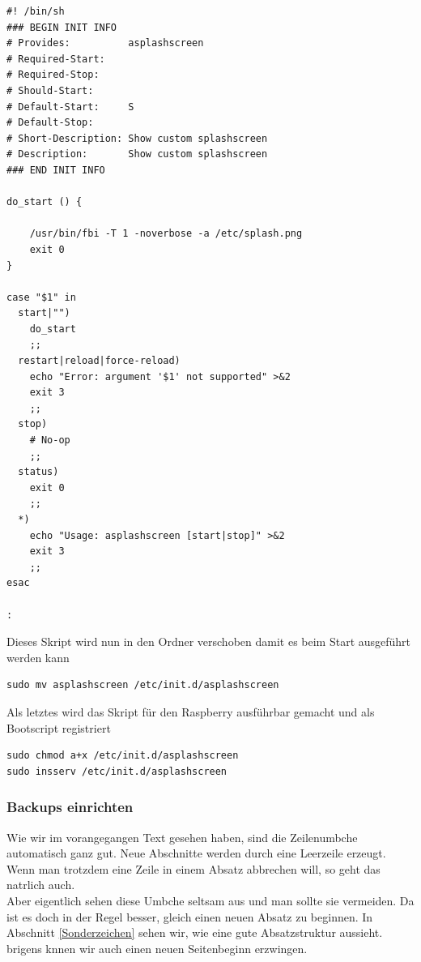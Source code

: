 \documentclass[11pt,a4paper]{article} %
\begin{document}
\begin{frame}

\begin{lstlisting}
#! /bin/sh
### BEGIN INIT INFO
# Provides:          asplashscreen
# Required-Start:
# Required-Stop:
# Should-Start:      
# Default-Start:     S
# Default-Stop:
# Short-Description: Show custom splashscreen
# Description:       Show custom splashscreen
### END INIT INFO
 
do_start () {
 
    /usr/bin/fbi -T 1 -noverbose -a /etc/splash.png    
    exit 0
}
 
case "$1" in
  start|"")
    do_start
    ;;
  restart|reload|force-reload)
    echo "Error: argument '$1' not supported" >&2
    exit 3
    ;;
  stop)
    # No-op
    ;;
  status)
    exit 0
    ;;
  *)
    echo "Usage: asplashscreen [start|stop]" >&2
    exit 3
    ;;
esac
 
:
\end{lstlisting}

\end{frame}

Dieses Skript wird nun in den Ordner verschoben damit es beim Start ausgeführt werden kann
\begin{frame}

\begin{lstlisting}
sudo mv asplashscreen /etc/init.d/asplashscreen
\end{lstlisting}
\end{frame}

Als letztes wird das Skript für den Raspberry ausführbar gemacht und als Bootscript registriert
\begin{frame}

\begin{lstlisting}
sudo chmod a+x /etc/init.d/asplashscreen
sudo insserv /etc/init.d/asplashscreen
\end{lstlisting}
\end{frame}

\subsubsection{Backups einrichten}





Wie wir im vorangegangen Text gesehen haben, sind die Zeilenumbche automatisch ganz gut. Neue Abschnitte werden durch eine Leerzeile erzeugt. Wenn man trotzdem eine Zeile in einem Absatz abbrechen will, so geht das natrlich auch. \\  Aber eigentlich sehen diese Umbche seltsam aus und man sollte sie vermeiden. Da ist es doch in der Regel besser, gleich einen neuen Absatz zu beginnen. In Abschnitt \ref{Sonderzeichen} sehen wir, wie eine gute Absatzstruktur aussieht. brigens knnen wir auch einen neuen Seitenbeginn erzwingen.
\end{document}
